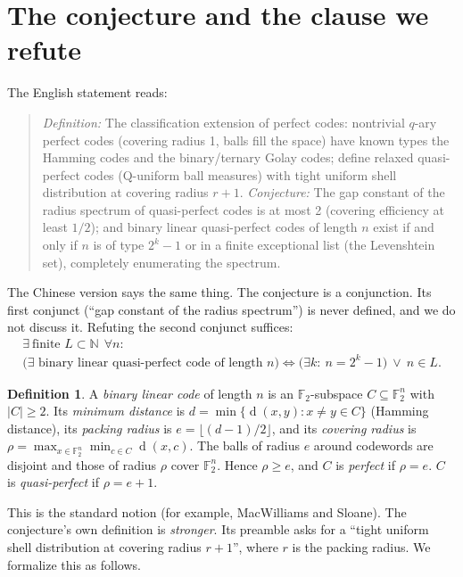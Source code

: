 \documentclass[11pt]{article}
\theoremstyle{definition}
\newtheorem{definition}[theorem]{Definition}
\theoremstyle{remark}
\newcommand{\F}{\mathbb{F}_2}
\newcommand{\dd}{\operatorname{d}}
\begin{document}
\section{The conjecture and the clause we refute}
The English statement reads:
\begin{quote}
\emph{Definition:} The classification extension of perfect codes: nontrivial
$q$-ary perfect codes (covering radius 1, balls fill the space) have known
types the Hamming codes and the binary/ternary Golay codes; define relaxed
quasi-perfect codes (Q-uniform ball measures) with tight uniform shell
distribution at covering radius $r+1$. \emph{Conjecture:} The gap constant of
the radius spectrum of quasi-perfect codes is at most 2 (covering efficiency
at least $1/2$); and binary linear quasi-perfect codes of length $n$ exist if
and only if $n$ is of type $2^k-1$ or in a finite exceptional list (the
Levenshtein set), completely enumerating the spectrum.
\end{quote}
The Chinese version says the same thing. The conjecture is a conjunction. Its
first conjunct (``gap constant of the radius spectrum'') is never defined, and
we do not discuss it. Refuting the second conjunct suffices:
\begin{equation}\label{eq:clause}
\begin{gathered}
\exists\ \text{finite } L\subset\mathbb{N}\ \ \forall n:\\
\bigl(\exists \text{ binary linear quasi-perfect code of length } n\bigr)
\iff \bigl(\exists k:\ n=2^k-1\bigr)\ \lor\ n\in L .
\end{gathered}
\end{equation}

\begin{definition}
A \emph{binary linear code} of length $n$ is an $\F$-subspace $C\subseteq\F^n$
with $|C|\ge 2$. Its \emph{minimum distance} is
$d=\min\{\dd(x,y): x\ne y\in C\}$ (Hamming distance), its \emph{packing
radius} is $e=\lfloor (d-1)/2\rfloor$, and its \emph{covering radius} is
$\rho=\max_{x\in\F^n}\min_{c\in C}\dd(x,c)$. The balls of radius $e$ around
codewords are disjoint and those of radius $\rho$ cover $\F^n$. Hence
$\rho\ge e$, and $C$ is \emph{perfect} if $\rho=e$. $C$ is
\emph{quasi-perfect} if $\rho=e+1$.
\end{definition}

This is the standard notion (for example, MacWilliams and Sloane). The
conjecture's own definition is \emph{stronger}. Its preamble asks for a
``tight uniform shell distribution at covering radius $r+1$'', where $r$ is
the packing radius. We formalize this as follows.
\end{document}
